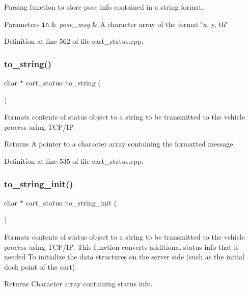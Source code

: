 Parsing function to store pose info contained in a string format. 
\begin{DoxyParams}[1]{Parameters}
\mbox{\tt in}  & {\em pose\+\_\+msg} & A character array of the format \char`\"{}x, y, th\char`\"{} \\
\hline
\end{DoxyParams}


Definition at line 562 of file cart\+\_\+status.\+cpp.

\mbox{\label{classcart__status_a555321d8af00245d5d53ec52876e54e7}} 
\subsubsection{\texorpdfstring{to\+\_\+string()}{to\_string()}}
{\footnotesize\ttfamily char $\ast$ cart\+\_\+status\+::to\+\_\+string (\begin{DoxyParamCaption}{ }\end{DoxyParamCaption})}

Formats contents of status object to a string to be transmitted to the vehicle process using T\+C\+P/\+IP. \begin{DoxyReturn}{Returns}
A pointer to a character array containing the formatted message. 
\end{DoxyReturn}


Definition at line 535 of file cart\+\_\+status.\+cpp.

\mbox{\label{classcart__status_ae7c18dab45a356066eb36b81b985194f}} 
\subsubsection{\texorpdfstring{to\+\_\+string\+\_\+init()}{to\_string\_init()}}
{\footnotesize\ttfamily char $\ast$ cart\+\_\+status\+::to\+\_\+string\+\_\+init (\begin{DoxyParamCaption}{ }\end{DoxyParamCaption})}

Formats contents of status object to a string to be transmitted to the vehicle process using T\+C\+P/\+IP. This function converts additional status info that is needed To initialize the data structures on the server side (such as the initial dock point of the cart). \begin{DoxyReturn}{Returns}
Character array containing status info. 
\end{DoxyReturn}


